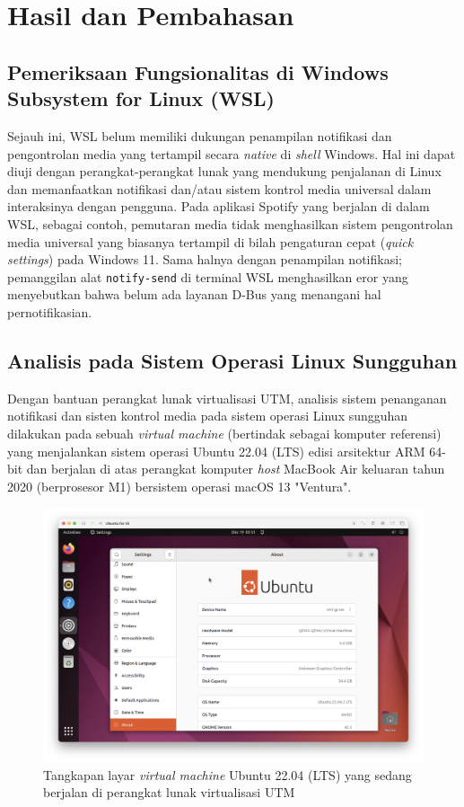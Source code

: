 \chapter{Hasil dan Pembahasan}

\section{Pemeriksaan Fungsionalitas di Windows Subsystem for Linux (WSL)}

Sejauh ini, WSL belum memiliki dukungan penampilan notifikasi dan pengontrolan media yang tertampil secara \textit{native} di \textit{shell} Windows. Hal ini dapat diuji dengan perangkat-perangkat lunak yang mendukung penjalanan di Linux dan memanfaatkan notifikasi dan/atau sistem kontrol media universal dalam interaksinya dengan pengguna. Pada aplikasi Spotify yang berjalan di dalam WSL, sebagai contoh, pemutaran media tidak menghasilkan sistem pengontrolan media universal yang biasanya tertampil di bilah pengaturan cepat (\textit{quick settings}) pada Windows 11. Sama halnya dengan penampilan notifikasi; pemanggilan alat \verb|notify-send| di terminal WSL menghasilkan eror yang menyebutkan bahwa belum ada layanan D-Bus yang menangani hal pernotifikasian.


\section{Analisis pada Sistem Operasi Linux Sungguhan}

Dengan bantuan perangkat lunak virtualisasi UTM, analisis sistem penanganan notifikasi dan sisten kontrol media pada sistem operasi Linux sungguhan dilakukan pada sebuah \textit{virtual machine} (bertindak sebagai komputer referensi) yang menjalankan sistem operasi Ubuntu 22.04 (LTS) edisi arsitektur ARM 64-bit dan berjalan di atas perangkat komputer \textit{host} MacBook Air keluaran tahun 2020 (berprosesor M1) bersistem operasi macOS 13 "Ventura".

\begin{figure}[h]
    \centering
    \includegraphics[width=1\linewidth]{assets/Screenshot 2023-12-19 at 10.51.04.png}
    \caption{Tangkapan layar \textit{virtual machine} Ubuntu 22.04 (LTS) yang sedang berjalan di perangkat lunak virtualisasi UTM}
    \label{fig:enter-label}
\end{figure}


